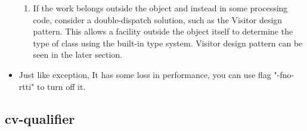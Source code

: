 \documentclass[a4paper,11pt,twoside]{book}
\begin{document}
\begin{itemize}
\begin{enumerate}
		\item If the work belongs outside the object and instead in some processing code, consider a double-dispatch solution, such as the Visitor design pattern. This allows a facility outside the object itself to determine the type of class using the built-in type system. Visitor design pattern can be seen in the later section.
	\end{enumerate}
	
	\item Just like exception, It has some loss in performance, you can use flag "-fno-rtti" to turn off it.
\end{itemize}


\subsection{cv-qualifier}
\end{document}
